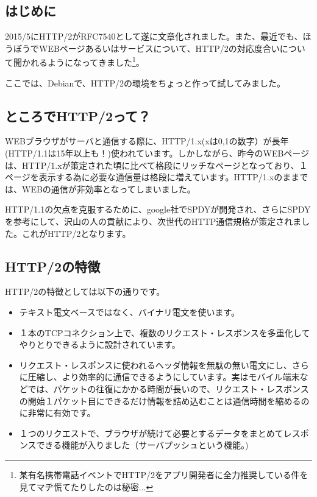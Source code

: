 \documentclass[mingoth,a4paper]{jsarticle}
\begin{document}


\subsection{はじめに}

 2015/5にHTTP/2がRFC7540として遂に文章化されました。また、最近でも、ほうぼうでWEBページあるいはサービスについて、HTTP/2の対応度合いについて聞かれるようになってきました\footnote{某有名携帯電話イベントでHTTP/2をアプリ開発者に全力推奨している件を見てマヂ慌てたりしたのは秘密...}。

 ここでは、Debianで、HTTP/2の環境をちょっと作って試してみました。

\subsection{ところでHTTP/2って？}

  WEBブラウザがサーバと通信する際に、HTTP/1.x(xは0,1の数字）が長年(HTTP/1.1は15年以上も！)使われています。しかしながら、昨今のWEBページは、HTTP/1.xが策定された頃に比べて格段にリッチなページとなっており、１ページを表示する為に必要な通信量は格段に増えています。HTTP/1.xのままでは、WEBの通信が非効率となってしまいました。

 HTTP/1.1の欠点を克服するために、google社でSPDYが開発され、さらにSPDYを参考にして、沢山の人の貢献により、次世代のHTTP通信規格が策定されました。これがHTTP/2となります。

 \subsection{HTTP/2の特徴}

 HTTP/2の特徴としては以下の通りです\cite{ref:http-2-faq}。
 
\begin{itemize}
\item テキスト電文ベースではなく、バイナリ電文を使います。
\item １本のTCPコネクション上で、複数のリクエスト・レスポンスを多重化してやりとりできるように設計されています。
\item  リクエスト・レスポンスに使われるヘッダ情報を無駄の無い電文にし、さらに圧縮し、より効率的に通信できるようにしています。実はモバイル端末などでは、パケットの往復にかかる時間が長いので、リクエスト・レスポンスの開始１パケット目にできるだけ情報を詰め込むことは通信時間を縮めるのに非常に有効です。
\item １つのリクエストで、ブラウザが続けて必要とするデータをまとめてレスポンスできる機能が入りました（サーバプッシュという機能。)\cite{ref:server-push-primer}
 \end{itemize}
\end{document}
